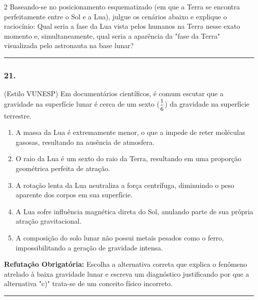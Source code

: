 \documentclass[twoside, 10pt, a4paper]{article}
\newlength{\espacoPreQuestao}\setlength{\espacoPreQuestao}{0.1cm}
\newlength{\espacoQuestao}\setlength{\espacoQuestao}{0.2cm}
\newlength{\espacoAlt}\setlength{\espacoAlt}{0.2cm}
\begin{document}
\begin{multicols*}{2}
Baseando-se no posicionamento esquematizado (em que a Terra se encontra perfeitamente entre o Sol e a Lua), julgue os cenários abaixo e explique o raciocínio:
Qual seria a fase da Lua vista pelos humanos na Terra nesse exato momento e, simultaneamente, qual seria a aparência da "fase da Terra" visualizada pelo astronauta na base lunar?
\par\vspace{\espacoQuestao}

\noindent\textcolor{CorLinha}{\rule{\linewidth}{0.5pt}} 
\par\vspace{\espacoPreQuestao}
\subsubsection*{21.} (Estilo VUNESP) Em documentários científicos, é comum escutar que a gravidade na superfície lunar é cerca de um sexto ($ \mfrac{1}{6} $) da gravidade na superfície terrestre.
\begin{enumerate}[label=\alph*), itemsep=\espacoAlt]
    \item A massa da Lua é extremamente menor, o que a impede de reter moléculas gasosas, resultando na ausência de atmosfera.
    \item O raio da Lua é um sexto do raio da Terra, resultando em uma proporção geométrica perfeita de atração.
    \item A rotação lenta da Lua neutraliza a força centrífuga, diminuindo o peso aparente dos corpos em sua superfície.
    \item A Lua sofre influência magnética direta do Sol, anulando parte de sua própria atração gravitacional.
    \item A composição do solo lunar não possui metais pesados como o ferro, impossibilitando a geração de gravidade intensa.
\end{enumerate}
\begin{boxdica}
\textbf{Refutação Obrigatória:} Escolha a alternativa correta que explica o fenômeno atrelado à baixa gravidade lunar e escreva um diagnóstico justificando por que a alternativa "c)" trata-se de um conceito físico incorreto.
\end{boxdica}
\par\vspace{\espacoQuestao}

\noindent\textcolor{CorLinha}{\rule{\linewidth}{0.5pt}} 
\par\vspace{\espacoPreQuestao}

\end{multicols*}
\end{document}
